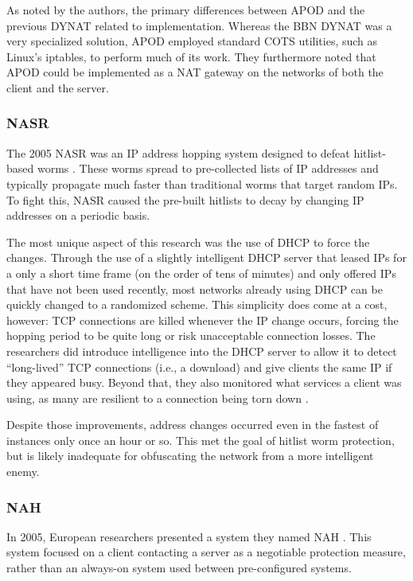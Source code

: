 \par As noted by the authors, the primary differences between APOD and the previous DYNAT related to implementation. Whereas the BBN DYNAT was a very specialized solution, APOD employed standard \ac{COTS} utilities, such as Linux's iptables, to perform much of its work. They furthermore noted that APOD could be implemented as a NAT gateway on the networks of both the client and the server.

\subsubsection{\acf{NASR}}
\par The 2005 \acf{NASR} was an IP address hopping system designed to defeat hitlist-based worms \cite{NASR}. These worms spread to pre-collected lists of IP addresses and typically propagate much faster than traditional worms that target random IPs. To fight this, NASR caused the pre-built hitlists to decay by changing IP addresses on a periodic basis.

\par The most unique aspect of this research was the use of \ac{DHCP} to force the changes. Through the use of a slightly intelligent \ac{DHCP} server that leased \acp{IP} for a only a short time frame (on the order of tens of minutes) and only offered IPs that have not been used recently, most networks already using DHCP can be quickly changed to a randomized scheme. This simplicity does come at a cost, however: TCP connections are killed whenever the IP change occurs, forcing the hopping period to be quite long or risk unacceptable connection losses. The researchers did introduce intelligence into the DHCP server to allow it to detect ``long-lived'' TCP connections (i.e., a download) and give clients the same IP if they appeared busy. Beyond that, they also monitored what services a client was using, as many are resilient to a connection being torn down \cite{NASR}.

\par Despite those improvements, address changes occurred even in the fastest of instances only once an hour or so. This met the goal of hitlist worm protection, but is likely inadequate for obfuscating the network from a more intelligent enemy.

\subsubsection{\acf{NAH}}
\par In 2005, European researchers presented a system they named \acf{NAH} \cite{NAH}. This system focused on a client contacting a server as a negotiable protection measure, rather than an always-on system used between pre-configured systems.

